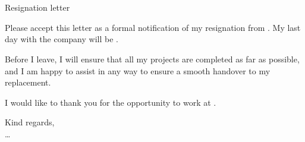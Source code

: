 \documentclass[a4paper]{letter}
\def\CompanyDetails{\ManagerName{} \\ \CompanyName{} \\ \CompanyAddress{}}
\begin{document}
\begin{letter}{\CompanyDetails{}}
{
    \opening{\noindent Resignation letter}{}
        Please accept this letter as a formal notification of my resignation from \CompanyName{}. My last day with the company will be \LastDay{}. %

        Before I leave, I will ensure that all my projects are completed as far as possible, and I am happy to assist in any way to ensure a smooth handover to my replacement.

        I would like to thank you for the opportunity to work at \CompanyName{}.
    \closing{Kind regards, \\ \ldots \\ \Name}
}
\end{letter}
\end{document}
